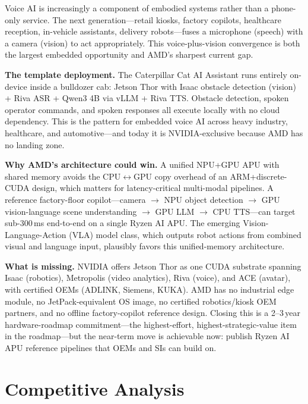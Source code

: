 \documentclass[blind]{gtac}
\begin{document}
Voice AI is increasingly a component of embodied systems rather than a phone-only service. The next generation---retail kiosks, factory copilots, healthcare reception, in-vehicle assistants, delivery robots---fuses a microphone (speech) with a camera (vision) to act appropriately. This voice-plus-vision convergence is both the largest embedded opportunity and AMD's sharpest current gap.

\textbf{The template deployment.} The Caterpillar Cat AI Assistant runs entirely on-device inside a bulldozer cab: Jetson Thor with Isaac obstacle detection (vision) + Riva ASR + Qwen3 4B via vLLM + Riva TTS. Obstacle detection, spoken operator commands, and spoken responses all execute locally with no cloud dependency. This is the pattern for embedded voice AI across heavy industry, healthcare, and automotive---and today it is NVIDIA-exclusive because AMD has no landing zone.

\textbf{Why AMD's architecture could win.} A unified NPU+GPU APU with shared memory avoids the CPU$\leftrightarrow$GPU copy overhead of an ARM+discrete-CUDA design, which matters for latency-critical multi-modal pipelines. A reference factory-floor copilot---camera $\rightarrow$ NPU object detection $\rightarrow$ GPU vision-language scene understanding $\rightarrow$ GPU LLM $\rightarrow$ CPU TTS---can target sub-300\,ms end-to-end on a single Ryzen AI APU. The emerging Vision-Language-Action (VLA) model class, which outputs robot actions from combined visual and language input, plausibly favors this unified-memory architecture.

\textbf{What is missing.} NVIDIA offers Jetson Thor as one CUDA substrate spanning Isaac (robotics), Metropolis (video analytics), Riva (voice), and ACE (avatar), with certified OEMs (ADLINK, Siemens, KUKA). AMD has no industrial edge module, no JetPack-equivalent OS image, no certified robotics/kiosk OEM partners, and no offline factory-copilot reference design. Closing this is a 2--3\,year hardware-roadmap commitment---the highest-effort, highest-strategic-value item in the roadmap---but the near-term move is achievable now: publish Ryzen AI APU reference pipelines that OEMs and SIs can build on.

\section{Competitive Analysis}
\label{sec:competitive}
\end{document}
